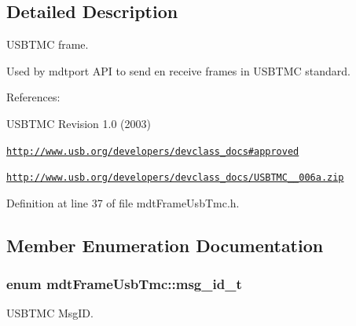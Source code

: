\subsection{Detailed Description}
USBTMC frame. 

Used by mdtport API to send en receive frames in USBTMC standard.

References:
\begin{DoxyItemize}
\item USBTMC Revision 1.0 (2003)
\item \href{http://www.usb.org/developers/devclass_docs#approved}{\tt http://www.usb.org/developers/devclass\_\-docs\#approved}
\item \href{http://www.usb.org/developers/devclass_docs/USBTMC_1_006a.zip}{\tt http://www.usb.org/developers/devclass\_\-docs/USBTMC\_\_\-006a.zip} 
\end{DoxyItemize}

Definition at line 37 of file mdtFrameUsbTmc.h.



\subsection{Member Enumeration Documentation}
\hypertarget{classmdt_frame_usb_tmc_a10c2216157b0616b69f6cabc5c8e253b}{
\subsubsection[{msg\_\-id\_\-t}]{\setlength{\rightskip}{0pt plus 5cm}enum {\bf mdtFrameUsbTmc::msg\_\-id\_\-t}}}
\label{classmdt_frame_usb_tmc_a10c2216157b0616b69f6cabc5c8e253b}


USBTMC MsgID. 

